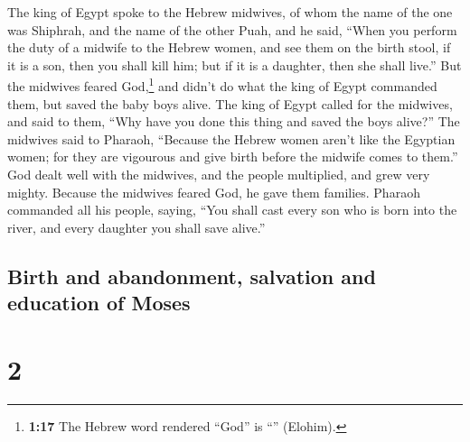  The king of Egypt spoke to the Hebrew midwives, of whom
the name of the one was Shiphrah, and the name of the other Puah,
 and he said, ``When you perform the duty of a midwife to
the Hebrew women, and see them on the birth stool, if it is a son, then
you shall kill him; but if it is a daughter, then she shall live.''
 But the midwives feared God,\footnote{\textbf{1:17} The
  Hebrew word rendered ``God'' is ``'' (Elohim).} and
didn't do what the king of Egypt commanded them, but saved the baby boys
alive.  The king of Egypt called for the midwives, and
said to them, ``Why have you done this thing and saved the boys alive?''
 The midwives said to Pharaoh, ``Because the Hebrew women
aren't like the Egyptian women; for they are vigourous and give birth
before the midwife comes to them.''  God dealt well with
the midwives, and the people multiplied, and grew very mighty.
 Because the midwives feared God, he gave them families.
 Pharaoh commanded all his people, saying, ``You shall
cast every son who is born into the river, and every daughter you shall
save alive.''

\hypertarget{birth-and-abandonment-salvation-and-education-of-moses}{%
\subsection{Birth and abandonment, salvation and education of
Moses}\label{birth-and-abandonment-salvation-and-education-of-moses}}

\hypertarget{section-1}{%
\section{2}\label{section-1}}


